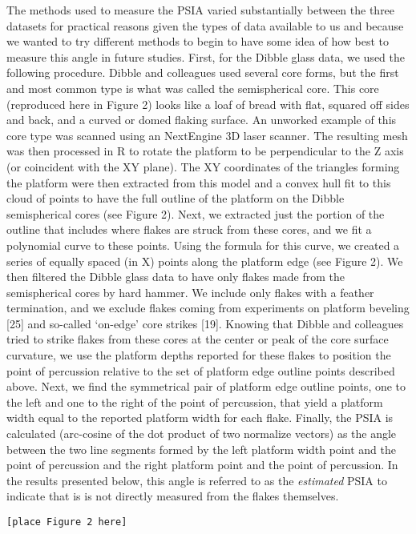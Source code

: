 \documentclass[10pt,letterpaper]{article}
\begin{document}
The methods used to measure the PSIA varied substantially between the
three datasets for practical reasons given the types of data available
to us and because we wanted to try different methods to begin to have
some idea of how best to measure this angle in future studies. First,
for the Dibble glass data, we used the following procedure. Dibble and
colleagues used several core forms, but the first and most common type
is what was called the semispherical core. This core (reproduced here in
Figure 2) looks like a loaf of bread with flat, squared off sides and
back, and a curved or domed flaking surface. An unworked example of this
core type was scanned using an NextEngine 3D laser scanner. The
resulting mesh was then processed in R to rotate the platform to be
perpendicular to the Z axis (or coincident with the XY plane). The XY
coordinates of the triangles forming the platform were then extracted
from this model and a convex hull fit to this cloud of points to have
the full outline of the platform on the Dibble semispherical cores (see
Figure 2). Next, we extracted just the portion of the outline that
includes where flakes are struck from these cores, and we fit a
polynomial curve to these points. Using the formula for this curve, we
created a series of equally spaced (in X) points along the platform edge
(see Figure 2). We then filtered the Dibble glass data to have only
flakes made from the semispherical cores by hard hammer. We include only
flakes with a feather termination, and we exclude flakes coming from
experiments on platform beveling {[}25{]} and so-called `on-edge' core
strikes {[}19{]}. Knowing that Dibble and colleagues tried to strike
flakes from these cores at the center or peak of the core surface
curvature, we use the platform depths reported for these flakes to
position the point of percussion relative to the set of platform edge
outline points described above. Next, we find the symmetrical pair of
platform edge outline points, one to the left and one to the right of
the point of percussion, that yield a platform width equal to the
reported platform width for each flake. Finally, the PSIA is calculated
(arc-cosine of the dot product of two normalize vectors) as the angle
between the two line segments formed by the left platform width point
and the point of percussion and the right platform point and the point
of percussion. In the results presented below, this angle is referred to
as the \emph{estimated} PSIA to indicate that is is not directly
measured from the flakes themselves.

\begin{verbatim}
[place Figure 2 here]
\end{verbatim}
\end{document}
